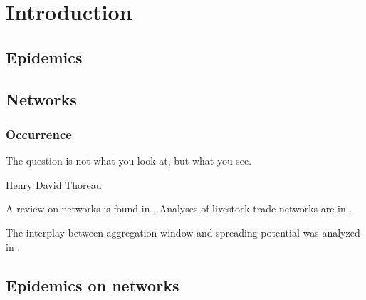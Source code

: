 \part{Introduction}

\chapter{Epidemics}

\chapter{Networks}
\section{Occurrence}

\epigraph{The question is not what you look at, but what you
see.}{Henry David Thoreau}

A review on networks is found in \citet{Newman2003}.
Analyses of livestock trade networks are in \citet{Christley:2005}
\citet{Bigras:2007}\citet{Green:2006}.

The interplay between aggregation window and spreading potential was analyzed in \citet{Bajardi:2012}.


\chapter{Epidemics on networks}


